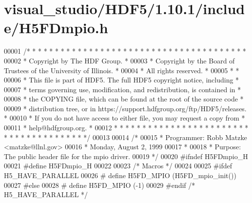 \hypertarget{visual__studio_2_h_d_f5_21_810_81_2include_2_h5_f_dmpio_8h_source}{}\section{visual\+\_\+studio/\+H\+D\+F5/1.10.1/include/\+H5\+F\+Dmpio.h}
\label{visual__studio_2_h_d_f5_21_810_81_2include_2_h5_f_dmpio_8h_source}

\begin{DoxyCode}
00001 \textcolor{comment}{/* * * * * * * * * * * * * * * * * * * * * * * * * * * * * * * * * * * * * * *}
00002 \textcolor{comment}{ * Copyright by The HDF Group.                                               *}
00003 \textcolor{comment}{ * Copyright by the Board of Trustees of the University of Illinois.         *}
00004 \textcolor{comment}{ * All rights reserved.                                                      *}
00005 \textcolor{comment}{ *                                                                           *}
00006 \textcolor{comment}{ * This file is part of HDF5.  The full HDF5 copyright notice, including     *}
00007 \textcolor{comment}{ * terms governing use, modification, and redistribution, is contained in    *}
00008 \textcolor{comment}{ * the COPYING file, which can be found at the root of the source code       *}
00009 \textcolor{comment}{ * distribution tree, or in https://support.hdfgroup.org/ftp/HDF5/releases.  *}
00010 \textcolor{comment}{ * If you do not have access to either file, you may request a copy from     *}
00011 \textcolor{comment}{ * help@hdfgroup.org.                                                        *}
00012 \textcolor{comment}{ * * * * * * * * * * * * * * * * * * * * * * * * * * * * * * * * * * * * * * */}
00013 
00014 \textcolor{comment}{/*}
00015 \textcolor{comment}{ * Programmer:  Robb Matzke <matzke@llnl.gov>}
00016 \textcolor{comment}{ *              Monday, August  2, 1999}
00017 \textcolor{comment}{ *}
00018 \textcolor{comment}{ * Purpose: The public header file for the mpio driver.}
00019 \textcolor{comment}{ */}
00020 \textcolor{preprocessor}{#ifndef H5FDmpio\_H}
00021 \textcolor{preprocessor}{#define H5FDmpio\_H}
00022 
00023 \textcolor{comment}{/* Macros */}
00024 
00025 \textcolor{preprocessor}{#ifdef H5\_HAVE\_PARALLEL}
00026 \textcolor{preprocessor}{#   define H5FD\_MPIO    (H5FD\_mpio\_init())}
00027 \textcolor{preprocessor}{#else}
00028 \textcolor{preprocessor}{#   define H5FD\_MPIO    (-1)}
00029 \textcolor{preprocessor}{#endif }\textcolor{comment}{/* H5\_HAVE\_PARALLEL */}\textcolor{preprocessor}{}

\end{DoxyCode}
